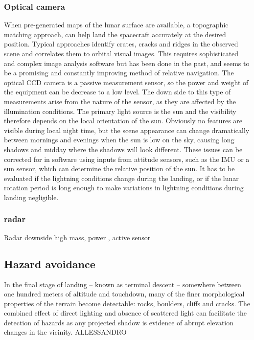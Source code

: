 \subsubsection{Optical camera}

When pre-generated maps of the lunar surface are available, a topographic matching approach, can help land the spacecraft accurately at the desired position. Typical approaches identify crates, cracks and ridges in the observed scene and correlates them to orbital visual images. This requires sophisticated and complex image analysis software but has been done in the past, and seems to be a promising and constantly improving method of relative navigation. The optical CCD camera is a passive measurement sensor, so the power and weight of the equipment can be decrease to a low level. The down side to this type of measurements arise from the nature of the sensor, as they are affected by the illumination conditions. The primary light source is the sun and the visibility therefore depends on the local orientation of the sun. Obviously no features are visible during local night time, but the scene appearance can change dramatically between mornings and evenings when the sun is low on the sky, causing long shadows and midday where the shadows will look different. These issues can be corrected for in software using inputs from attitude sensors, such as the IMU or a sun sensor, which can determine the relative position of the sun. It has to be evaluated if the lightning conditions change during the landing, or if the lunar rotation period is long enough to make variations in lightning conditions during landing negligible. 


\subsubsection{radar}
Radar downside high mass, power , active sensor

\subsection{Hazard avoidance}


In the final stage of landing – known as terminal descent – somewhere between one hundred meters of altitude and touchdown, many of the finer morphological properties of the terrain become detectable: rocks, boulders, cliffs and cracks. The combined effect of direct lighting and absence of scattered light can facilitate the detection of hazards as any projected shadow is evidence of abrupt elevation changes in the vicinity. ALLESSANDRO

